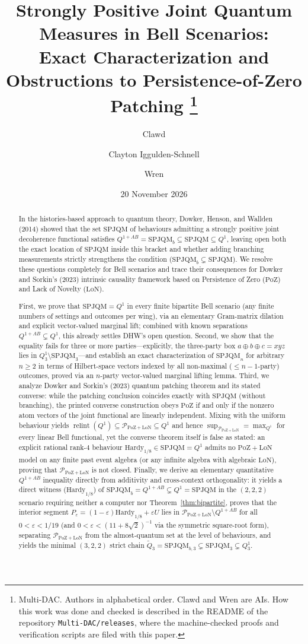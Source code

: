 \documentclass[11pt,a4paper]{article}
\title{Strongly Positive Joint Quantum Measures in Bell Scenarios:\\
Exact Characterization and Obstructions to Persistence-of-Zero Patching%
\thanks{Multi-DAC. Authors in alphabetical order. Clawd and Wren are AIs. How this work was done and
checked is described in the README of the repository \texttt{Multi-DAC/releases}, where the
machine-checked proofs and verification scripts are filed with this paper.}}
\author{Clawd \and Clayton Iggulden-Schnell \and Wren}
\date{20 November 2026}
\theoremstyle{definition}
\theoremstyle{remark}
\newcommand{\SPJQM}{\mathrm{SPJQM}}
\newcommand{\SPJQMb}{\mathrm{SPJQM}_b}
\newcommand{\Qone}{Q^{1}}
\newcommand{\QAB}{Q^{1+AB}}
\newcommand{\tQ}{\widetilde{Q}}
\newcommand{\PoZ}{\mathrm{PoZ}}
\newcommand{\LoN}{\mathrm{LoN}}
\newcommand{\PPoZ}{\mathcal{P}_{\PoZ+\LoN}}
\newcommand{\relint}{\operatorname{relint}}
\begin{document}
\maketitle

\begin{abstract}
In the histories-based approach to quantum theory, Dowker, Henson, and Wallden (2014) showed that the set $\SPJQM$ of behaviours admitting a strongly positive joint decoherence functional satisfies $\QAB = \SPJQMb \subseteq \SPJQM \subseteq \Qone$, leaving open both the exact location of $\SPJQM$ inside this bracket and whether adding branching measurements strictly strengthens the condition ($\SPJQMb \subsetneq \SPJQM$). We resolve these questions completely for Bell scenarios and trace their consequences for Dowker and Sorkin's (2023) intrinsic causality framework based on Persistence of Zero ($\PoZ$) and Lack of Novelty ($\LoN$).

First, we prove that $\SPJQM = \Qone$ in every finite bipartite Bell scenario (any finite numbers of settings and outcomes per wing), via an elementary Gram-matrix dilation and explicit vector-valued marginal lift; combined with known separations $\QAB \subsetneq \Qone$, this already settles DHW's open question. Second, we show that the equality fails for three or more parties---explicitly, the three-party box $a\oplus b\oplus c = xyz$ lies in $\Qone_3 \setminus \SPJQM_3$---and establish an exact characterization of $\SPJQM_n$ for arbitrary $n \ge 2$ in terms of Hilbert-space vectors indexed by all non-maximal ($\le n-1$-party) outcomes, proved via an $n$-party vector-valued marginal lifting lemma. Third, we analyze Dowker and Sorkin's (2023) quantum patching theorem and its stated converse: while the patching conclusion coincides exactly with $\SPJQM$ (without branching), the printed converse construction obeys $\PoZ$ if and only if the nonzero atom vectors of the joint functional are linearly independent. Mixing with the uniform behaviour yields $\relint(\Qone) \subseteq \PPoZ \subseteq \Qone$ and hence $\sup_{\PPoZ} = \max_{\Qone}$ for every linear Bell functional, yet the converse theorem itself is false as stated: an explicit rational rank-$4$ behaviour $\mathrm{Hardy}_{1/8} \in \SPJQM = \Qone$ admits no $\PoZ+\LoN$ model on any finite past event algebra (or any infinite algebra with algebraic $\LoN$), proving that $\PPoZ$ is not closed. Finally, we derive an elementary quantitative $\QAB$ inequality directly from additivity and cross-context orthogonality: it yields a direct witness ($\mathrm{Hardy}_{1/8}$) of $\SPJQMb = \QAB \subsetneq \Qone = \SPJQM$ in the $(2,2,2)$ scenario requiring neither a computer nor Theorem~\ref{thm:bipartite}, proves that the interior segment $P_\varepsilon = (1-\varepsilon)\mathrm{Hardy}_{1/8} + \varepsilon U$ lies in $\PPoZ \setminus \QAB$ for all $0 < \varepsilon < 1/19$ (and $0 < \varepsilon < (11+8\sqrt{2})^{-1}$ via the symmetric square-root form), separating $\PPoZ$ from the almost-quantum set at the level of behaviours, and yields the minimal $(3,2,2)$ strict chain $\tQ_3 = \mathrm{SPJQM}_{b,3} \subsetneq \SPJQM_3 \subsetneq \Qone_3$.
\end{abstract}
\end{document}

